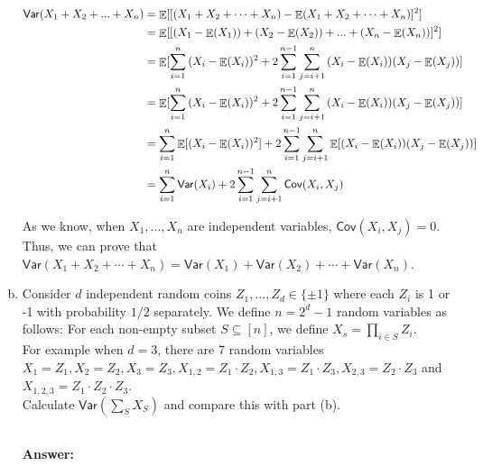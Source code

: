 \documentclass[12pt]{article}
\newcommand{\Answer}{\ \\ \textbf{Answer:} }
\DeclareMathOperator*{\E}{\mathbb{E}}
\newcommand{\Var}{\mathsf{Var}}
\newcommand{\Cov}{\mathsf{Cov}}
\begin{document}
\begin{problem}[30 points]
\begin{enumerate}[(a)]
\begin{equation}
\begin{aligned}
\Var(X_1 + X_2 + ... + X_n) &= \E[[(X_1 + X_2 + \cdots + X_n) - \E(X_1 + X_2 + \cdots + X_n)]^2] \\
& = \E[[(X_1 - \E(X_1)) + (X_2 - \E(X_2)) + ... + (X_n - \E(X_n))]^2] \\
& = \E[\sum_{i=1}^{n}{(X_i - \E(X_i))^2} + 2\sum_{i=1}^{n-1}\sum_{j=i+1}^{n}{(X_i - \E(X_i))(X_j - \E(X_j))}] \\
& = \E[\sum_{i=1}^{n}{(X_i - \E(X_i))^2} + 2\sum_{i=1}^{n-1}\sum_{j=i+1}^{n}{(X_i - \E(X_i))(X_j - \E(X_j))}] \\
& = \sum_{i=1}^{n}{\E[(X_i - \E(X_i))^2]} + 2\sum_{i=1}^{n-1}\sum_{j=i+1}^{n}{\E[(X_i - \E(X_i))(X_j - \E(X_j))]} \notag \\
& = \sum_{i=1}^{n}{\Var(X_i)} + 2\sum_{i=1}^{n-1}\sum_{j=i+1}^{n}{\Cov(X_i, X_j)} \notag \\
\end{aligned}
\end{equation}

As we know, when $X_1, ..., X_n$ are independent variables, $\Cov(X_i, X_j) = 0$. \\
Thus, we can prove that $\Var(X_1 + X_2 + \cdots + X_n) = \Var(X_1) + \Var(X_2) + \cdots + \Var(X_n)$.


\item Consider $d$ independent random coins $Z_1, ..., Z_d \in \{\pm 1\}$ where each $Z_i$ is 1 or -1 with probability $1/2$ separately.
We define $n = 2^d - 1$ random variables as follows: For each non-empty subset $S \subseteq [n]$, we define $X_s = \prod_{i \in S} Z_i$. \\
For example when $d = 3$, there are 7 random variables $X_1 = Z_1, X_2 = Z_2, X_3 = Z_3, X_{1,2} = Z_1 \cdot Z_2, X_{1,3} = Z_1 \cdot Z_3, X_{2,3} = Z_2 \cdot Z_3$
and $X_{1,2,3} = Z_1 \cdot Z_2 \cdot Z_3$. \\
Calculate $\Var(\sum_{S}X_S)$ and compare this with part (b).

\Answer


\end{enumerate}
\end{problem}
\end{document}
